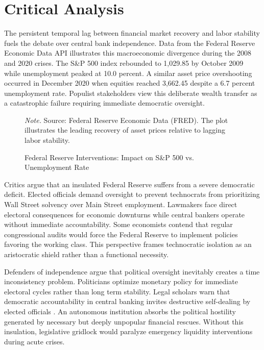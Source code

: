 \documentclass[12pt]{article}
\newcommand{\safeincludegraphics}[2][]{%
  \adjustimage{max width=\textwidth, #1}{#2}%
}
\begin{document}
\section{Critical Analysis}
{} The persistent temporal lag between financial market recovery and labor stability fuels the debate over central bank independence. Data from the Federal Reserve Economic Data API illustrates this macroeconomic divergence during the 2008 and 2020 crises. The S\&P 500 index rebounded to 1,029.85 by October 2009 while unemployment peaked at 10.0 percent. A similar asset price overshooting occurred in December 2020 when equities reached 3,662.45 despite a 6.7 percent unemployment rate. Populist stakeholders view this deliberate wealth transfer as a catastrophic failure requiring immediate democratic oversight.

\begin{figure}[H]
  \centering
  \safeincludegraphics[width=0.8\textwidth]{analysis_plot.png}
  \caption{Federal Reserve Interventions: Impact on S\&P 500 vs. Unemployment Rate}
  \label{fig:macro_divergence}
  \textit{Note.} Source: Federal Reserve Economic Data (FRED). The plot illustrates the leading recovery of asset prices relative to lagging labor stability.
\end{figure}

{} Critics argue that an insulated Federal Reserve suffers from a severe democratic deficit. Elected officials demand oversight to prevent technocrats from prioritizing Wall Street solvency over Main Street employment. Lawmakers face direct electoral consequences for economic downturns while central bankers operate without immediate accountability. Some economists contend that regular congressional audits would force the Federal Reserve to implement policies favoring the working class. This perspective frames technocratic isolation as an aristocratic shield rather than a functional necessity.

{} Defenders of independence argue that political oversight inevitably creates a time inconsistency problem. Politicians optimize monetary policy for immediate electoral cycles rather than long term stability. Legal scholars warn that democratic accountability in central banking invites destructive self-dealing by elected officials \parencite{Buchanan_2016}. An autonomous institution absorbs the political hostility generated by necessary but deeply unpopular financial rescues. Without this insulation, legislative gridlock would paralyze emergency liquidity interventions during acute crises.
\end{document}
